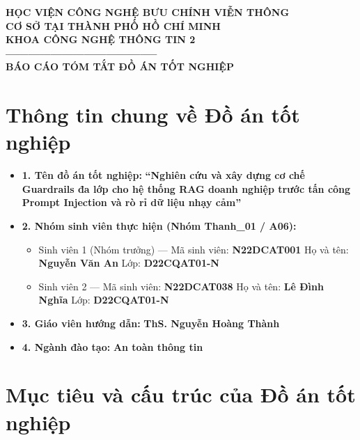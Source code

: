 \documentclass[a4paper,12pt]{article}
\begin{document}
\begin{center}
  {\bfseries\fontsize{13pt}{16pt}\selectfont HỌC VIỆN CÔNG NGHỆ BƯU CHÍNH VIỄN THÔNG}\\
  {\bfseries\fontsize{13pt}{16pt}\selectfont CƠ SỞ TẠI THÀNH PHỐ HỒ CHÍ MINH}\\
  {\bfseries\fontsize{13pt}{16pt}\selectfont KHOA CÔNG NGHỆ THÔNG TIN 2}\\
  \textbf{-----------------------------------------}\\[0.5cm]
  {\bfseries\fontsize{18pt}{22pt}\selectfont BÁO CÁO TÓM TẮT ĐỒ ÁN TỐT NGHIỆP}\\[0.4cm]
\end{center}

\section{Thông tin chung về Đồ án tốt nghiệp}

\begin{itemize}
    \item \textbf{1. Tên đồ án tốt nghiệp:} \textbf{``Nghiên cứu và xây dựng cơ chế Guardrails đa lớp cho hệ thống RAG doanh nghiệp trước tấn công Prompt Injection và rò rỉ dữ liệu nhạy cảm''}
    \item \textbf{2. Nhóm sinh viên thực hiện (Nhóm Thanh\_01 / A06):}
    \begin{itemize}
        \item Sinh viên 1 (Nhóm trưởng) --- Mã sinh viên: \textbf{N22DCAT001} \quad Họ và tên: \textbf{Nguyễn Văn An} \quad Lớp: \textbf{D22CQAT01-N}
        \item Sinh viên 2 --- Mã sinh viên: \textbf{N22DCAT038} \quad Họ và tên: \textbf{Lê Đình Nghĩa} \quad Lớp: \textbf{D22CQAT01-N}
    \end{itemize}
    \item \textbf{3. Giáo viên hướng dẫn:} \textbf{ThS. Nguyễn Hoàng Thành}
    \item \textbf{4. Ngành đào tạo:} \textbf{An toàn thông tin}
\end{itemize}

\section{Mục tiêu và cấu trúc của Đồ án tốt nghiệp}
\end{document}
